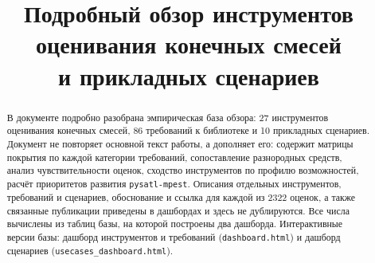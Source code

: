 \documentclass[10pt,a4paper]{article}
\title{Подробный обзор инструментов оценивания конечных смесей\\и прикладных сценариев}
\author{}
\date{}
\begin{document}
\maketitle

\begin{abstract}\noindent
В документе подробно разобрана эмпирическая база обзора: 27 инструментов оценивания конечных смесей, 86 требований к библиотеке
и 10 прикладных сценариев. Документ не повторяет основной текст работы, а дополняет его: содержит матрицы покрытия по каждой категории требований, сопоставление разнородных средств,
анализ чувствительности оценок, сходство инструментов по профилю возможностей, расчёт приоритетов развития \texttt{pysatl-mpest}. Описания отдельных инструментов, требований и сценариев,
обоснование и ссылка для каждой из 2322 оценок, а также связанные публикации приведены в дашбордах и здесь не дублируются. Все числа вычислены из таблиц базы, на которой построены два дашборда.
Интерактивные версии базы: дашборд инструментов и требований (\texttt{dashboard.html}) и дашборд сценариев (\texttt{usecases\_dashboard.html}).
\end{abstract}
\tableofcontents
\clearpage
\end{document}
